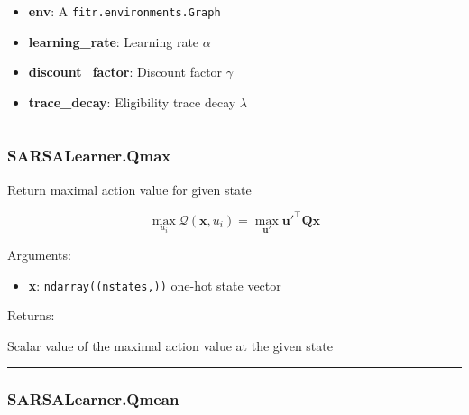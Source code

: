 \begin{itemize}
\tightlist
\item
  \textbf{env}: A \texttt{fitr.environments.Graph}
\item
  \textbf{learning\_rate}: Learning rate \(\alpha\)
\item
  \textbf{discount\_factor}: Discount factor \(\gamma\)
\item
  \textbf{trace\_decay}: Eligibility trace decay \(\lambda\)
\end{itemize}

\begin{center}\rule{0.5\linewidth}{\linethickness}\end{center}

\hypertarget{sarsalearner.qmax}{%
\subsubsection{SARSALearner.Qmax}\label{sarsalearner.qmax}}

\begin{Shaded}
\begin{Highlighting}[]
\end{Highlighting}
\end{Shaded}

Return maximal action value for given state

\[
\max_{u_i}\mathcal Q(\mathbf x, u_i) = \max_{\mathbf u'} \mathbf u'^\top \mathbf Q \mathbf x
\]

Arguments:

\begin{itemize}
\tightlist
\item
  \textbf{x}: \texttt{ndarray((nstates,))} one-hot state vector
\end{itemize}

Returns:

Scalar value of the maximal action value at the given state

\begin{center}\rule{0.5\linewidth}{\linethickness}\end{center}

\hypertarget{sarsalearner.qmean}{%
\subsubsection{SARSALearner.Qmean}\label{sarsalearner.qmean}}

\begin{Shaded}
\begin{Highlighting}[]
\end{Highlighting}
\end{Shaded}

